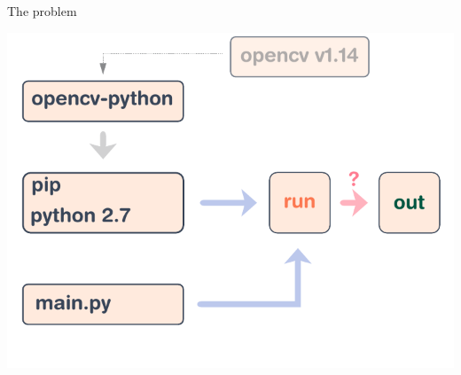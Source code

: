 \documentclass[aspectratio=169]{beamer}
\begin{document}
\begin{frame}{The problem}
    \begin{center}
        \includegraphics[height=0.98\textheight]{img/schema-build.pdf}
    \end{center}
\end{frame}
\end{document}
